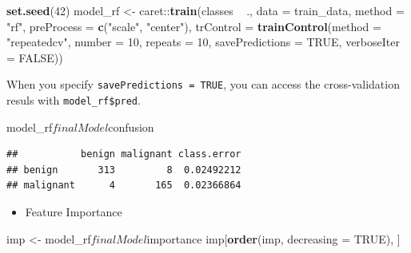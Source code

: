 \documentclass[]{article}
\newenvironment{Shaded}{\begin{snugshade}}{\end{snugshade}}
\newcommand{\KeywordTok}[1]{\textcolor[rgb]{0.13,0.29,0.53}{\textbf{{#1}}}}
\newcommand{\DataTypeTok}[1]{\textcolor[rgb]{0.13,0.29,0.53}{{#1}}}
\newcommand{\DecValTok}[1]{\textcolor[rgb]{0.00,0.00,0.81}{{#1}}}
\newcommand{\StringTok}[1]{\textcolor[rgb]{0.31,0.60,0.02}{{#1}}}
\newcommand{\OtherTok}[1]{\textcolor[rgb]{0.56,0.35,0.01}{{#1}}}
\newcommand{\NormalTok}[1]{{#1}}
\providecommand{\tightlist}{%
  \setlength{\itemsep}{0pt}\setlength{\parskip}{0pt}}
\begin{document}
\begin{Shaded}
\begin{Highlighting}[]
\KeywordTok{set.seed}\NormalTok{(}\DecValTok{42}\NormalTok{)}
\NormalTok{model_rf <-}\StringTok{ }\NormalTok{caret::}\KeywordTok{train}\NormalTok{(classes ~}\StringTok{ }\NormalTok{.,}
                         \DataTypeTok{data =} \NormalTok{train_data,}
                         \DataTypeTok{method =} \StringTok{"rf"}\NormalTok{,}
                         \DataTypeTok{preProcess =} \KeywordTok{c}\NormalTok{(}\StringTok{"scale"}\NormalTok{, }\StringTok{"center"}\NormalTok{),}
                         \DataTypeTok{trControl =} \KeywordTok{trainControl}\NormalTok{(}\DataTypeTok{method =} \StringTok{"repeatedcv"}\NormalTok{, }
                                                  \DataTypeTok{number =} \DecValTok{10}\NormalTok{, }
                                                  \DataTypeTok{repeats =} \DecValTok{10}\NormalTok{, }
                                                  \DataTypeTok{savePredictions =} \OtherTok{TRUE}\NormalTok{, }
                                                  \DataTypeTok{verboseIter =} \OtherTok{FALSE}\NormalTok{))}
\end{Highlighting}
\end{Shaded}

When you specify \texttt{savePredictions\ =\ TRUE}, you can access the
cross-validation resuls with \texttt{model\_rf\$pred}.

\begin{Shaded}
\begin{Highlighting}[]
\NormalTok{model_rf$finalModel$confusion}
\end{Highlighting}
\end{Shaded}

\begin{verbatim}
##           benign malignant class.error
## benign       313         8  0.02492212
## malignant      4       165  0.02366864
\end{verbatim}

\begin{itemize}
\tightlist
\item
  Feature Importance
\end{itemize}

\begin{Shaded}
\begin{Highlighting}[]
\NormalTok{imp <-}\StringTok{ }\NormalTok{model_rf$finalModel$importance}
\NormalTok{imp[}\KeywordTok{order}\NormalTok{(imp, }\DataTypeTok{decreasing =} \OtherTok{TRUE}\NormalTok{), ]}
\end{Highlighting}
\end{Shaded}
\end{document}
